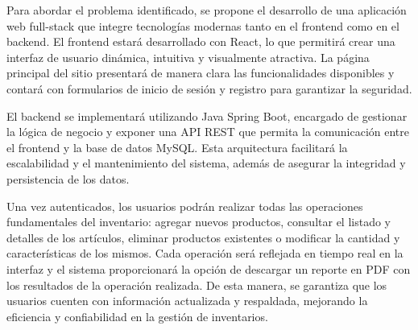 Para abordar el problema identificado, se propone el desarrollo de una aplicación web full-stack que integre tecnologías modernas tanto en el frontend como en el backend. El frontend estará desarrollado con React, lo que permitirá crear una interfaz de usuario dinámica, intuitiva y visualmente atractiva. La página principal del sitio presentará de manera clara las funcionalidades disponibles y contará con formularios de inicio de sesión y registro para garantizar la seguridad.

El backend se implementará utilizando Java Spring Boot, encargado de gestionar la lógica de negocio y exponer una API REST que permita la comunicación entre el frontend y la base de datos MySQL. Esta arquitectura facilitará la escalabilidad y el mantenimiento del sistema, además de asegurar la integridad y persistencia de los datos.

Una vez autenticados, los usuarios podrán realizar todas las operaciones fundamentales del inventario: agregar nuevos productos, consultar el listado y detalles de los artículos, eliminar productos existentes o modificar la cantidad y características de los mismos. Cada operación será reflejada en tiempo real en la interfaz y el sistema proporcionará la opción de descargar un reporte en PDF con los resultados de la operación realizada. De esta manera, se garantiza que los usuarios cuenten con información actualizada y respaldada, mejorando la eficiencia y confiabilidad en la gestión de inventarios.
